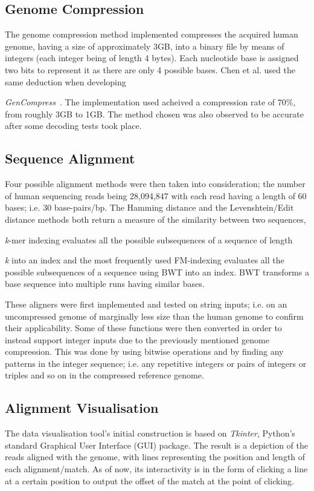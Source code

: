 \documentclass{csfyp}
\begin{document}
\subsection{Genome Compression}\vspace{-2ex}
The genome compression method implemented compresses the acquired human genome, having a size of approximately 3GB, into a binary file by means of integers (each integer being of length 4 bytes).  Each nucleotide base is assigned two bits to represent it as there are only 4 possible bases. Chen et al. used the same deduction when developing {\textit{GenCompress}~\cite{gencompress}.  The implementation used acheived a compression rate of 70\%, from roughly 3GB to 1GB.  The method chosen was also observed to be accurate after some decoding tests took place.        

\subsection{Sequence Alignment}\vspace{-2ex}
Four possible alignment methods were then taken into consideration; the number of human sequencing reads being 28,094,847 with each read having a length of 60 bases; i.e. 30 base-pairs/bp.  The Hamming distance and the Levenshtein/Edit distance methods both return a measure of the similarity between two sequences,  {\textit{k}-mer indexing evaluates all the possible subsequences of a sequence of length {\textit{k} into an index and the most frequently used FM-indexing evaluates all the possible subsequences of a sequence using BWT into an index.  BWT transforms a base sequence into multiple runs having similar bases.  

These aligners were first implemented and tested on string inputs; i.e. on an uncompressed genome of marginally less size than the human genome to confirm their applicability.  Some of these functions were then converted in order to instead support integer inputs due to the previously mentioned genome compression.  This was done by using bitwise operations and by finding any patterns in the integer sequence; i.e. any repetitive integers or pairs of integers or triples and so on in the compressed reference genome.        

\subsection{Alignment Visualisation}\vspace{-2ex}
The data visualisation tool's initial construction is based on {\textit{Tkinter}}, Python's standard Graphical User Interface (GUI) package.  The result is a depiction of the reads aligned with the genome, with lines representing the position and length of each alignment/match.  As of now, its interactivity is in the form of clicking a line at a certain position to output the offset of the match at the point of clicking.     

}}}
\end{document}
